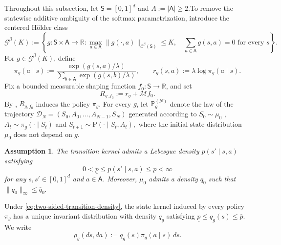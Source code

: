 \documentclass{article}
\theoremstyle{definition}
\theoremstyle{remark}
\theoremstyle{plain}
\newtheorem{assumption}[proposition]{Assumption}
\newcommand{\MKQ}{\mathrm{P}}
\numberwithin{equation}{section}
\begin{document}
Throughout this subsection, let \(\mathsf S=[0,1]^d\) and
\(A:=|\mathsf A|\geq2\).To remove the statewise additive ambiguity of the
softmax parametrization, introduce the centered H\"older class
\begin{equation}
\label{eq:centered-logit-class}
    \mathcal G^\beta(K)
    :=
    \left\{
        g:\mathsf S\times\mathsf A\to\mathbb R:
        \max_{a\in\mathsf A}
        \|g(\cdot,a)\|_{\mathcal C^\beta(\mathsf S)}
        \leq K,\quad
        \sum_{a\in\mathsf A}g(s,a)=0
        \text{ for every }s
    \right\}.
\end{equation}
For \(g\in\mathcal G^\beta(K)\), define
\begin{equation}
\label{eq:lower-bound-policy-reward}
    \pi_g(a\mid s)
    :=
    \frac{\exp(g(s,a)/\lambda)}
         {\sum_{b\in\mathsf A}\exp(g(s,b)/\lambda)},
    \qquad
    r_g(s,a)
    :=
    \lambda\log\pi_g(a\mid s).
\end{equation}
Fix a bounded measurable shaping function
\(f_0:\mathsf S\to\mathbb R\), and set
\begin{equation}
\label{eq:lower-bound-compatible-reward}
    R_{g,f_0}
    :=
    r_g+\mathcal M f_0.
\end{equation}
By , \(R_{g,f_0}\) induces the policy
\(\pi_g\). For every \(g\), let \(\mathbb P_g^{(N)}\) denote the law of the
trajectory \(\mathcal D_N
    =
    (S_0,A_0,\ldots,A_{N-1},S_N)\)
generated according to
\(
    S_0\sim\mu_0\)
    ,
    \(
    A_t\sim\pi_g(\cdot\mid S_t)\) and 
    \(S_{t+1}\sim\MKQ(\cdot\mid S_t,A_t),
\)
where the initial state distribution \(\mu_0\) does not depend on \(g\).

\begin{assumption}
\label{assum:lower-bound-dynamics}
The transition kernel admits a Lebesgue density
\(p(s'\mid s,a)\) satisfying
\begin{equation}
\label{eq:two-sided-transition-density}
    0<\underline p
    \leq
    p(s'\mid s,a)
    \leq
    \overline p<\infty
\end{equation}
for any \(s,s'\in[0,1]^d\) and \(a\in\mathsf A\).
Moreover, \(\mu_0\) admits a density \(q_0\) such that \(\|q_0\|_\infty\leq\overline q_0.\)
\end{assumption}

Under \eqref{eq:two-sided-transition-density}, the state kernel induced
by every policy \(\pi_g\) has a unique invariant distribution with
density \(q_g\) satisfying \( \underline p
    \leq
    q_g(s)
    \leq
    \overline p.\)
We write
\[
    \rho_g(ds,da)
    :=
    q_g(s)\pi_g(a\mid s)\,ds.
\]
\end{document}
